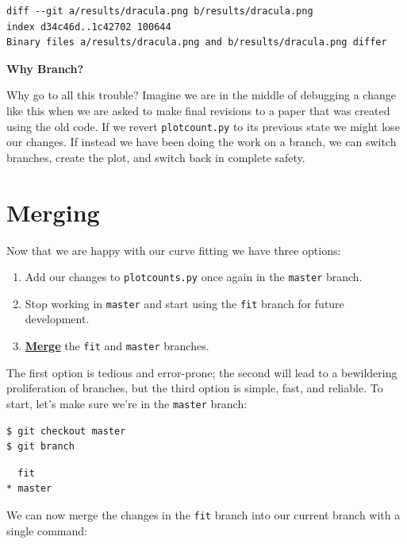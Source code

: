 \documentclass[
]{krantz}
\providecommand{\tightlist}{%
  \setlength{\itemsep}{0pt}\setlength{\parskip}{0pt}}
\renewenvironment{quote}{\begin{VF}}{\end{VF}}
\newcommand{\gref}[2]{\hyperlink{#2}{\textbf{#1}}}
\begin{document}
\begin{verbatim}
diff --git a/results/dracula.png b/results/dracula.png
index d34c46d..1c42702 100644
Binary files a/results/dracula.png and b/results/dracula.png differ
\end{verbatim}

\begin{quote}
\textbf{Why Branch?}

Why go to all this trouble?
Imagine we are in the middle of debugging a change like this
when we are asked to make final revisions
to a paper that was created using the old code.
If we revert \texttt{plotcount.py} to its previous state we might lose our changes.
If instead we have been doing the work on a branch,
we can switch branches,
create the plot,
and switch back in complete safety.
\end{quote}

\hypertarget{git-advanced-merge}{%
\section{Merging}\label{git-advanced-merge}}

Now that we are happy with our curve fitting we have three options:

\begin{enumerate}
\def\labelenumi{\arabic{enumi}.}
\tightlist
\item
  Add our changes to \texttt{plotcounts.py} once again in the \texttt{master} branch.
\item
  Stop working in \texttt{master} and start using the \texttt{fit} branch for future development.
\item
  \gref{Merge}{git\_merge} the \texttt{fit} and \texttt{master} branches.
\end{enumerate}

The first option is tedious and error-prone;
the second will lead to a bewildering proliferation of branches,
but the third option is simple, fast, and reliable.
To start,
let's make sure we're in the \texttt{master} branch:

\begin{verbatim}
$ git checkout master
$ git branch
\end{verbatim}

\begin{verbatim}
  fit
* master
\end{verbatim}

We can now merge the changes in the \texttt{fit} branch into our current branch
with a single command:
\end{document}
